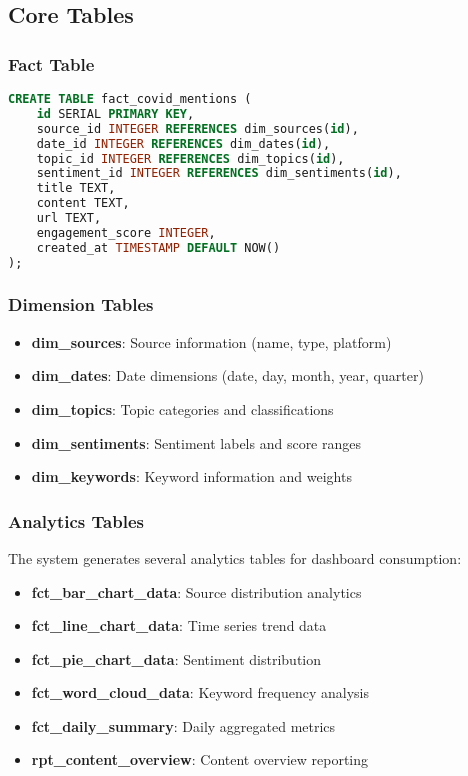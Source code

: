 \documentclass[12pt,a4paper]{article}
\begin{document}
\subsection{Core Tables}

\subsubsection{Fact Table}
\begin{lstlisting}[language=sql, caption=Fact Table Schema]
CREATE TABLE fact_covid_mentions (
    id SERIAL PRIMARY KEY,
    source_id INTEGER REFERENCES dim_sources(id),
    date_id INTEGER REFERENCES dim_dates(id),
    topic_id INTEGER REFERENCES dim_topics(id),
    sentiment_id INTEGER REFERENCES dim_sentiments(id),
    title TEXT,
    content TEXT,
    url TEXT,
    engagement_score INTEGER,
    created_at TIMESTAMP DEFAULT NOW()
);
\end{lstlisting}

\subsubsection{Dimension Tables}
\begin{itemize}
    \item \textbf{dim\_sources}: Source information (name, type, platform)
    \item \textbf{dim\_dates}: Date dimensions (date, day, month, year, quarter)
    \item \textbf{dim\_topics}: Topic categories and classifications
    \item \textbf{dim\_sentiments}: Sentiment labels and score ranges
    \item \textbf{dim\_keywords}: Keyword information and weights
\end{itemize}

\subsubsection{Analytics Tables}
The system generates several analytics tables for dashboard consumption:
\begin{itemize}
    \item \textbf{fct\_bar\_chart\_data}: Source distribution analytics
    \item \textbf{fct\_line\_chart\_data}: Time series trend data
    \item \textbf{fct\_pie\_chart\_data}: Sentiment distribution
    \item \textbf{fct\_word\_cloud\_data}: Keyword frequency analysis
    \item \textbf{fct\_daily\_summary}: Daily aggregated metrics
    \item \textbf{rpt\_content\_overview}: Content overview reporting
\end{itemize}
\end{document}
